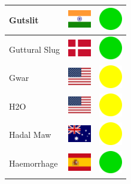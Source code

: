 \documentclass[12pt, a4paper, twoside]{report}
\begin{document}
\begin{center}
\begin{longtable}{|p{5cm}|p{2cm}|p{2cm}|}
 Gutslit                                                    & \includegraphics[width=1cm]{../img/flags/in} &   \includegraphics[width=1cm]{../likes/y} \\ \hline
 Guttural Slug                                              & \includegraphics[width=1cm]{../img/flags/dk} &   \includegraphics[width=1cm]{../likes/y} \\ \hline
 Gwar                                                       & \includegraphics[width=1cm]{../img/flags/us} &   \includegraphics[width=1cm]{../likes/m} \\ \hline
 H2O                                                        & \includegraphics[width=1cm]{../img/flags/us} &   \includegraphics[width=1cm]{../likes/m} \\ \hline
 Hadal Maw                                                  & \includegraphics[width=1cm]{../img/flags/au} &   \includegraphics[width=1cm]{../likes/m} \\ \hline
 Haemorrhage                                                & \includegraphics[width=1cm]{../img/flags/es} &   \includegraphics[width=1cm]{../likes/y} \\ \hline

\end{longtable}
\end{center}
\end{document}
